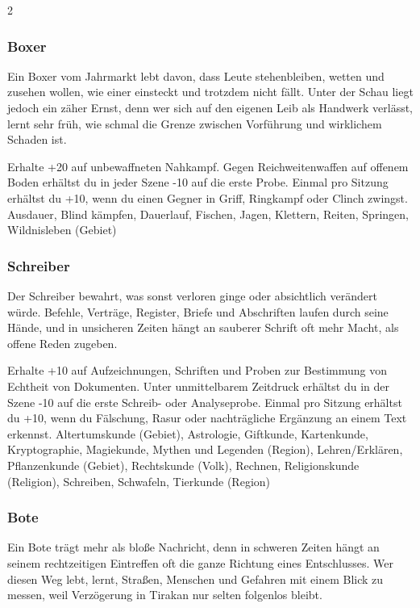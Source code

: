 {\begin{multicols*}{2}
        \subsubsection*{Boxer}
        Ein Boxer vom Jahrmarkt lebt davon, dass Leute stehenbleiben, wetten und zusehen wollen, wie einer einsteckt und trotzdem nicht fällt. Unter der Schau liegt jedoch ein zäher Ernst, denn wer sich auf den eigenen Leib als Handwerk verlässt, lernt sehr früh, wie schmal die Grenze zwischen Vorführung und wirklichem Schaden ist.

        \wegespielwertebox
        {Erhalte +20 auf unbewaffneten Nahkampf.}
        {Gegen Reichweitenwaffen auf offenem Boden erhältst du in jeder Szene -10 auf die erste Probe.}
        {Einmal pro Sitzung erhältst du +10, wenn du einen Gegner in Griff, Ringkampf oder Clinch zwingst.}
        {Ausdauer, Blind kämpfen, Dauerlauf, Fischen, Jagen, Klettern, Reiten, Springen, Wildnisleben (Gebiet)}

        \subsubsection*{Schreiber}
        Der Schreiber bewahrt, was sonst verloren ginge oder absichtlich verändert würde. Befehle, Verträge, Register, Briefe und Abschriften laufen durch seine Hände, und in unsicheren Zeiten hängt an sauberer Schrift oft mehr Macht, als offene Reden zugeben.

        \wegespielwertebox
        {Erhalte +10 auf Aufzeichnungen, Schriften und Proben zur Bestimmung von Echtheit von Dokumenten.}
        {Unter unmittelbarem Zeitdruck erhältst du in der Szene -10 auf die erste Schreib- oder Analyseprobe.}
        {Einmal pro Sitzung erhältst du +10, wenn du Fälschung, Rasur oder nachträgliche Ergänzung an einem Text erkennst.}
        {Altertumskunde (Gebiet), Astrologie, Giftkunde, Kartenkunde, Kryptographie, Magiekunde, Mythen und Legenden (Region), Lehren/Erklären, Pflanzenkunde (Gebiet), Rechtskunde (Volk), Rechnen, Religionskunde (Religion), Schreiben, Schwafeln, Tierkunde (Region)}

        \subsubsection*{Bote}
        Ein Bote trägt mehr als bloße Nachricht, denn in schweren Zeiten hängt an seinem rechtzeitigen Eintreffen oft die ganze Richtung eines Entschlusses. Wer diesen Weg lebt, lernt, Straßen, Menschen und Gefahren mit einem Blick zu messen, weil Verzögerung in Tirakan nur selten folgenlos bleibt.


\end{multicols*}}
